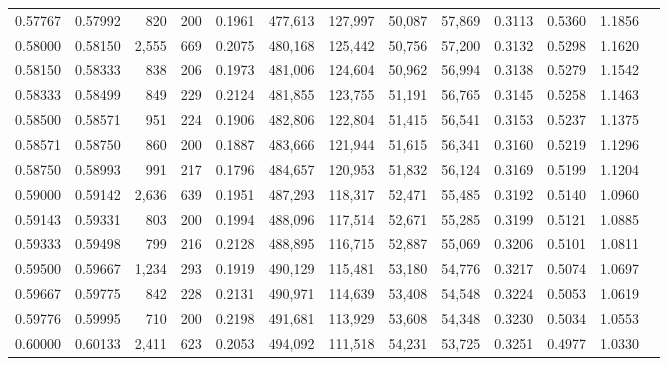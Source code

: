 \begin{tabular}{rrrrrrrrrrrrr}
0.57767 & 0.57992 &   820 & 200 &                                     0.1961 & 477,613 & 127,997 &  50,087 &  57,869 & 0.3113 & 0.5360 & 1.1856 \\
0.58000 & 0.58150 & 2,555 & 669 &                                     0.2075 & 480,168 & 125,442 &  50,756 &  57,200 & 0.3132 & 0.5298 & 1.1620 \\
0.58150 & 0.58333 &   838 & 206 &                                     0.1973 & 481,006 & 124,604 &  50,962 &  56,994 & 0.3138 & 0.5279 & 1.1542 \\
0.58333 & 0.58499 &   849 & 229 &                                     0.2124 & 481,855 & 123,755 &  51,191 &  56,765 & 0.3145 & 0.5258 & 1.1463 \\
0.58500 & 0.58571 &   951 & 224 &                                     0.1906 & 482,806 & 122,804 &  51,415 &  56,541 & 0.3153 & 0.5237 & 1.1375 \\
0.58571 & 0.58750 &   860 & 200 &                                     0.1887 & 483,666 & 121,944 &  51,615 &  56,341 & 0.3160 & 0.5219 & 1.1296 \\
0.58750 & 0.58993 &   991 & 217 &                                     0.1796 & 484,657 & 120,953 &  51,832 &  56,124 & 0.3169 & 0.5199 & 1.1204 \\
0.59000 & 0.59142 & 2,636 & 639 &                                     0.1951 & 487,293 & 118,317 &  52,471 &  55,485 & 0.3192 & 0.5140 & 1.0960 \\
0.59143 & 0.59331 &   803 & 200 &                                     0.1994 & 488,096 & 117,514 &  52,671 &  55,285 & 0.3199 & 0.5121 & 1.0885 \\
0.59333 & 0.59498 &   799 & 216 &                                     0.2128 & 488,895 & 116,715 &  52,887 &  55,069 & 0.3206 & 0.5101 & 1.0811 \\
0.59500 & 0.59667 & 1,234 & 293 &                                     0.1919 & 490,129 & 115,481 &  53,180 &  54,776 & 0.3217 & 0.5074 & 1.0697 \\
0.59667 & 0.59775 &   842 & 228 &                                     0.2131 & 490,971 & 114,639 &  53,408 &  54,548 & 0.3224 & 0.5053 & 1.0619 \\
0.59776 & 0.59995 &   710 & 200 &                                     0.2198 & 491,681 & 113,929 &  53,608 &  54,348 & 0.3230 & 0.5034 & 1.0553 \\
0.60000 & 0.60133 & 2,411 & 623 &                                     0.2053 & 494,092 & 111,518 &  54,231 &  53,725 & 0.3251 & 0.4977 & 1.0330 \\

\end{tabular}
